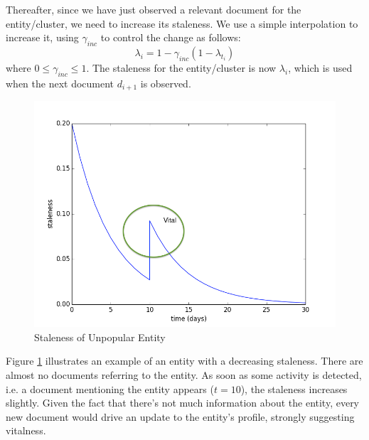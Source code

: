 \documentclass{article}
\begin{document}
Thereafter, since we have just observed a relevant document for the entity/cluster, we need to increase its staleness. 
We use a simple interpolation to increase it, using $\gamma_{inc}$ to control the change as follows:
\begin{equation}
\lambda_i = 1 - \gamma_{inc}(1 - \lambda_{t_i})
\end{equation}
where $0 \leq \gamma_{inc} \leq 1$.
The staleness for the entity/cluster is now $\lambda_i$, which is used when the next document $d_{i+1}$ is observed.

\begin{figure}[tb]
\centering
\includegraphics[width=0.7\columnwidth]{fig/staleness1.png}
\caption{Staleness of Unpopular Entity}
\label{stalenesslow}
\end{figure}

Figure \ref{stalenesslow} illustrates an example of an entity with a decreasing staleness. 
There are almost no documents referring to the entity. 
As soon as some activity is detected, i.e. a document mentioning the entity appears ($t=10$), the staleness increases slightly. 
Given the fact that there's not much information about the entity, every new document would drive an update to the entity's profile, strongly suggesting vitalness.
\end{document}
